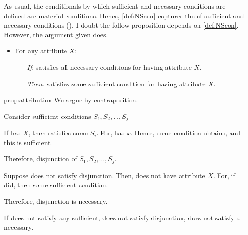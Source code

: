 \begin{note}
  \noindent%
  As usual, the conditionals by which sufficient and necessary conditions are defined are material conditions.
  Hence, \autoref{def:NScon} captures the  of sufficient and necessary conditions
  (\cite[cf.][\S2]{Brennan:2022aa}).
  I doubt the follow proposition depends on \autoref{def:NScon}.
  However, the argument given does.

  \begin{proposition}[Attribution]
    \label{prop:attribution}

    \begin{itemize}
    \item
      For any attribute \(X\):
      \begin{itemize}
      \item[\emph{If}:]
        \vAgent{} satisfies all necessary conditions for having attribute \(X\).
      \item[\emph{Then}:]
        \vAgent{} satisfies some sufficient condition for having attribute \(X\).
      \end{itemize}
    \end{itemize}
    \vspace{-\baselineskip}
  \end{proposition}

  \begin{argument}{prop:attribution}
    We argue by contraposition.

    Consider sufficient conditions \(S_{1}, S_{2}, \dots, S_{j}\)

    If \vAgent{} has \(X\), then \vAgent{} satisfies some \(S_{i}\).
    For, \vAgent{} has \(x\).
    Hence, some condition obtains, and this is sufficient.

    Therefore, disjunction of \(S_{1}, S_{2}, \dots, S_{j}\).

    Suppose \vAgent{} does not satisfy disjunction.
    Then, \vAgent{} does not have attribute \(X\).
    For, if did, then some sufficient condition.

    Therefore, disjunction is necessary.

    If does not satisfy any sufficient, does not satisfy disjunction, does not satisfy all necessary.
  \end{argument}
\end{note}

